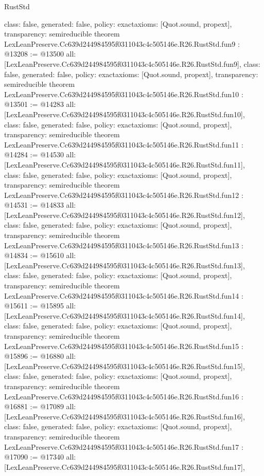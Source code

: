 \begin{lexlean}{RustStd}
\begin{coremodule}
{  class: false,
  generated: false,
  policy: exact{axioms: [Quot.sound, propext]},
  transparency: semireducible
}
theorem LexLeanPreserve.Cc639d244984595f0311043c4c505146e.R26.RustStd.fun9 : @13208 := @13500 {
  all: [LexLeanPreserve.Cc639d244984595f0311043c4c505146e.R26.RustStd.fun9],
  class: false,
  generated: false,
  policy: exact{axioms: [Quot.sound, propext]},
  transparency: semireducible
}
theorem LexLeanPreserve.Cc639d244984595f0311043c4c505146e.R26.RustStd.fun10 : @13501 := @14283 {
  all: [LexLeanPreserve.Cc639d244984595f0311043c4c505146e.R26.RustStd.fun10],
  class: false,
  generated: false,
  policy: exact{axioms: [Quot.sound, propext]},
  transparency: semireducible
}
theorem LexLeanPreserve.Cc639d244984595f0311043c4c505146e.R26.RustStd.fun11 : @14284 := @14530 {
  all: [LexLeanPreserve.Cc639d244984595f0311043c4c505146e.R26.RustStd.fun11],
  class: false,
  generated: false,
  policy: exact{axioms: [Quot.sound, propext]},
  transparency: semireducible
}
theorem LexLeanPreserve.Cc639d244984595f0311043c4c505146e.R26.RustStd.fun12 : @14531 := @14833 {
  all: [LexLeanPreserve.Cc639d244984595f0311043c4c505146e.R26.RustStd.fun12],
  class: false,
  generated: false,
  policy: exact{axioms: [Quot.sound, propext]},
  transparency: semireducible
}
theorem LexLeanPreserve.Cc639d244984595f0311043c4c505146e.R26.RustStd.fun13 : @14834 := @15610 {
  all: [LexLeanPreserve.Cc639d244984595f0311043c4c505146e.R26.RustStd.fun13],
  class: false,
  generated: false,
  policy: exact{axioms: [Quot.sound, propext]},
  transparency: semireducible
}
theorem LexLeanPreserve.Cc639d244984595f0311043c4c505146e.R26.RustStd.fun14 : @15611 := @15895 {
  all: [LexLeanPreserve.Cc639d244984595f0311043c4c505146e.R26.RustStd.fun14],
  class: false,
  generated: false,
  policy: exact{axioms: [Quot.sound, propext]},
  transparency: semireducible
}
theorem LexLeanPreserve.Cc639d244984595f0311043c4c505146e.R26.RustStd.fun15 : @15896 := @16880 {
  all: [LexLeanPreserve.Cc639d244984595f0311043c4c505146e.R26.RustStd.fun15],
  class: false,
  generated: false,
  policy: exact{axioms: [Quot.sound, propext]},
  transparency: semireducible
}
theorem LexLeanPreserve.Cc639d244984595f0311043c4c505146e.R26.RustStd.fun16 : @16881 := @17089 {
  all: [LexLeanPreserve.Cc639d244984595f0311043c4c505146e.R26.RustStd.fun16],
  class: false,
  generated: false,
  policy: exact{axioms: [Quot.sound, propext]},
  transparency: semireducible
}
theorem LexLeanPreserve.Cc639d244984595f0311043c4c505146e.R26.RustStd.fun17 : @17090 := @17340 {
  all: [LexLeanPreserve.Cc639d244984595f0311043c4c505146e.R26.RustStd.fun17],
}
\end{coremodule}
\end{lexlean}
